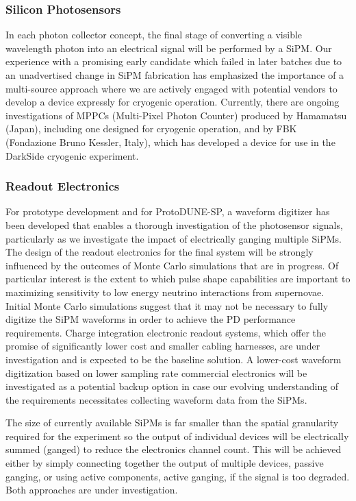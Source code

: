 \subsubsection{Silicon Photosensors} 
In each photon collector concept, the final stage of converting a visible wavelength photon into an electrical signal will be performed by a SiPM. Our experience with a promising early candidate which failed in later batches due to an unadvertised change in SiPM fabrication has emphasized the importance of a multi-source approach where we are actively engaged with potential vendors to develop a device expressly for cryogenic operation. Currently, there are ongoing investigations of MPPCs (Multi-Pixel Photon Counter) produced by Hamamatsu (Japan), including one designed for cryogenic operation, and by FBK (Fondazione Bruno Kessler, Italy), which has developed a device for use in the DarkSide cryogenic experiment.

\subsubsection{Readout Electronics} 
For prototype development and for ProtoDUNE-SP, a waveform digitizer has been developed that enables a thorough investigation of the photosensor signals, particularly as we investigate the impact of electrically ganging multiple SiPMs. The design of the readout electronics for the final system will be strongly influenced by the outcomes of Monte Carlo simulations that are in progress. Of particular interest is the extent to which pulse  shape capabilities are important to maximizing sensitivity to low energy neutrino interactions from supernovae. 
Initial Monte Carlo simulations suggest that it may not be necessary to fully digitize the SiPM waveforms in order to achieve the PD performance requirements.  Charge integration electronic readout systems, which offer the promise of significantly lower cost and smaller cabling harnesses, are under investigation and is expected to be the baseline solution.
A lower-cost waveform digitization based on lower sampling rate commercial electronics will be investigated as a potential backup option in case our evolving understanding of the requirements necessitates collecting waveform data from the SiPMs.

The size of currently available SiPMs is far smaller than the spatial granularity required for the experiment so the output of individual devices will be electrically summed (ganged) to reduce the electronics channel count. This will be achieved either by simply connecting together the output of multiple devices, passive ganging, or using active components, active ganging, if the signal is too degraded. Both approaches are under investigation. 

